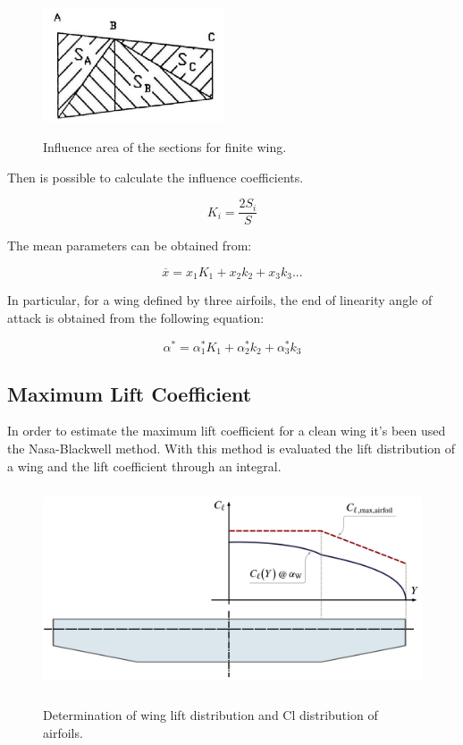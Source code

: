\begin{figure}[H]
\centering
{\includegraphics[height=3.4cm]{Immagini/influencearea}} 
\caption{Influence area of the sections for finite wing.}
\label{fig:influencearea}
\end{figure}



Then is possible to calculate the influence coefficients. 

\begin{equation}
K_i = \frac{2 S_i}{S}
\end{equation}

The mean parameters can be obtained from:

\begin{equation}
\overline{x} = x_1 K_1 + x_2 k_2 +x_3 k_3...
\end{equation}

In particular, for a wing defined by three airfoils, the end of linearity angle of attack is obtained from the following equation:

\begin{equation}
\alpha^* = \alpha^*_{1} K_1 + \alpha^*_{2} k_2 +\alpha^*_{3} k_3
\end{equation}

\subsection{Maximum Lift Coefficient}

In order to estimate the maximum lift coefficient for a clean wing it's been used the Nasa-Blackwell method. With this method is evaluated the lift distribution of a wing and the lift coefficient through an integral. 

\begin{figure}[H]
\centering
{\includegraphics[height=6cm]{Immagini/Loading_Stall_Path_A}} 
\caption{Determination of wing lift distribution and Cl distribution of airfoils.}
\label{fig:stall0}
\end{figure}




